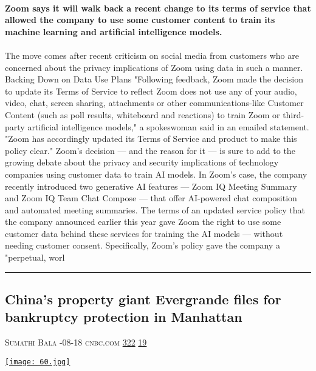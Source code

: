 \documentclass[10pt,a4paper]{article}
\begin{document}
\begin{multicols}{2}
\paragraph{}
\textbf{Zoom says it will walk back a recent change to its terms of service that allowed the company to use some customer content to train its machine learning and artificial intelligence models.}
\paragraph{}

The move comes after recent criticism on social media from customers who are concerned about the privacy implications of Zoom using data in such a manner.
Backing Down on Data Use Plans
"Following feedback, Zoom made the decision to update its Terms of Service to reflect Zoom does not use any of your audio, video, chat, screen sharing, attachments or other communications-like Customer Content (such as poll results, whiteboard and reactions) to train Zoom or third-party artificial intelligence models," a spokeswoman said in an emailed statement. "Zoom has accordingly updated its Terms of Service and product to make this policy clear."
Zoom's decision — and the reason for it — is sure to add to the growing debate about the privacy and security implications of technology companies using customer data to train AI models.
In Zoom's case, the company recently introduced two generative AI features — Zoom IQ Meeting Summary and Zoom IQ Team Chat Compose — that offer AI-powered chat composition and automated meeting summaries. The terms of an updated service policy that the company announced earlier this year gave Zoom the right to use some customer data behind these services for training the AI models — without needing customer consent.
Specifically, Zoom's policy gave the company a "perpetual, worl
\par\noindent\textcolor{red}{\rule{\linewidth}{0.2mm}}
\vfill
\null
\noindent\begin{minipage}{\linewidth}
\subsection{China’s property giant Evergrande files for bankruptcy protection in Manhattan}
\textsc{\footnotesize
{\scriptsize\faUser}\space 
Sumathi Bala 
{\scriptsize\faCalendar}-08-18 
{\scriptsize\faGlobe}\space 
cnbc.com 
{\scriptsize\faThumbsOUp}\space 
\href{http://news.ycombinator.com/item?id=37171187\&utm\_term=comment}{322} 
{\scriptsize\faComments}\space 
\href{http://news.ycombinator.com/item?id=37171187\&utm\_term=comment}{19} 
}
\par\medskip\noindent
\href{https://www.cnbc.com/2023/08/18/china-property-developer-evergrande-files-for-bankruptcy-protection-in-us.html?utm\_source=hackernewsletter\&utm\_medium=email\&utm\_term=startup\_news}{
    \texttt{[image: 60.jpg]}
}
\end{minipage}

\end{multicols}
\end{document}
